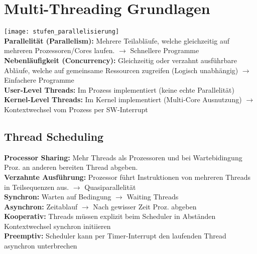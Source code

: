 
\section{Multi-Threading Grundlagen}
\texttt{[image: stufen\_parallelisierung]}\\
\textcolor{b}{\textbf{Parallelität (Parallelism):}} Mehrere Teilabläufe, welche gleichzeitig auf mehreren Prozessoren/Cores laufen. $\rightarrow$ Schnellere Programme\\
\textcolor{b}{\textbf{Nebenläufigkeit (Concurrency):}} Gleichzeitig oder verzahnt ausführbare Abläufe, welche auf gemeinsame Ressourcen zugreifen (Logisch unabhängig) $\rightarrow$ Einfachere Programme\\
\textcolor{b}{\textbf{User-Level Threads:}} Im Prozess implementiert (keine echte Parallelität)\\
\textcolor{b}{\textbf{Kernel-Level Threads:}} Im Kernel implementiert (Multi-Core Ausnutzung) $\rightarrow$ Kontextwechsel vom Prozess per SW-Interrupt
\subsection{Thread Scheduling}
\textcolor{b}{\textbf{Processor Sharing:}} Mehr Threads als Prozessoren und bei Wartebidingung Proz. an anderen bereiten Thread abgeben.\\
\textcolor{b}{\textbf{Verzahnte Ausführung:}} Prozessor führt Instruktionen von mehreren Threads in Teilsequenzen aus. $\rightarrow$ Quasiparallelität\\
\textcolor{b}{\textbf{Synchron:}} Warten auf Bedingung $\rightarrow$ Waiting Threads\\
\textcolor{b}{\textbf{Asynchron:}} Zeitablauf $\rightarrow$ Nach gewisser Zeit Proz. abgeben\\
\textcolor{b}{\textbf{Kooperativ:}} Threads müssen explizit beim Scheduler in Abständen Kontextwechsel synchron initiieren\\
\textcolor{b}{\textbf{Preemptiv:}} Scheduler kann per Timer-Interrupt den laufenden Thread asynchron unterbrechen
